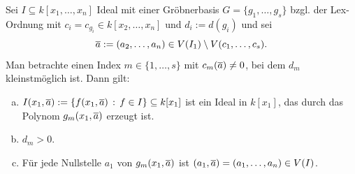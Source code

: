 \documentclass[11pt]{article}
\numberwithin{equation}{section}
\begin{document}
\begin{lemma} \label{big:lemma} 
	Sei $I \subseteq k[x_1,\ldots,x_n]$ Ideal mit einer Gröbnerbasis $G = \{g_1,\ldots,g_s\}$ bzgl. der Lex-Ordnung mit $c_i = c_{g_i}\in k[x_2,\ldots,x_n]$ und $d_i := d(g_i)$ und sei
	\[
		\overline{a} := (a_2,\ldots,a_n) \in V(I_1) \setminus V(c_1,\ldots,c_s).
	\]
	Man betrachte einen Index $m \in \{1,\ldots,s\}$ mit $c_m(\overline{a}) \ne 0$, bei dem $d_m$ kleinstmöglich ist.  Dann gilt: 
	\begin{enumerate}[(a)]
		\item $I(x_1,\overline{a}):= \left\{  f(x_1, \overline{a})  \,:\,  f \in I \right\} \subseteq k[x_1]$ ist ein Ideal in $k[x_1]$, das durch das Polynom $g_m(x_1,\overline{a})$ erzeugt ist. 
		\item $d_m > 0$. 
		\item Für jede Nullstelle $a_1$ von $g_m(x_1, \overline{a})$ ist $(a_1, \overline{a}) = (a_1,\ldots,a_n) \in V(I)$. 
	\end{enumerate} 
\end{lemma} 
\end{document}
